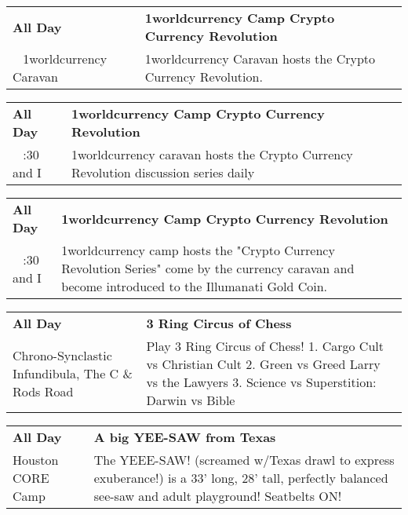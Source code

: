 
\tiny{}

\begin{tabular}{ p{1in} p{2.2in} }
    \textbf{All Day} & \textbf{1worldcurrency Camp Crypto Currency Revolution} \\
    ~ \newline 1worldcurrency Caravan & 1worldcurrency Caravan hosts the Crypto Currency Revolution. \\
    \hline 
\end{tabular}
    
\begin{tabular}{ p{1in} p{2.2in} }
    \textbf{All Day} & \textbf{1worldcurrency Camp Crypto Currency Revolution} \\
    ~ \newline 7:30 and I & 1worldcurrency caravan hosts the Crypto Currency Revolution discussion series daily \\
    \hline 
\end{tabular}
    
\begin{tabular}{ p{1in} p{2.2in} }
    \textbf{All Day} & \textbf{1worldcurrency Camp Crypto Currency Revolution} \\
    ~ \newline 7:30 and I & 1worldcurrency camp hosts the "Crypto Currency Revolution Series" come by the currency caravan and become introduced to the Illumanati Gold Coin. \\
    \hline 
\end{tabular}
    
\begin{tabular}{ p{1in} p{2.2in} }
    \textbf{All Day} & \textbf{3 Ring Circus of Chess } \\
    Chrono-Synclastic Infundibula, The \newline C \& Rods Road & Play 3 Ring Circus of Chess!
1. Cargo Cult vs Christian Cult 
2. Green vs Greed
Larry vs the Lawyers
3. Science vs Superstition:
Darwin vs Bible \\
    \hline 
\end{tabular}
    
\begin{tabular}{ p{1in} p{2.2in} }
    \textbf{All Day} & \textbf{A big YEE-SAW from Texas} \\
    Houston CORE Camp \newline  & The YEEE-SAW! (screamed w/Texas drawl to express exuberance!) is a 33' long, 28' tall, perfectly balanced see-saw and adult playground! Seatbelts ON! \\
    \hline 
\end{tabular}
    
